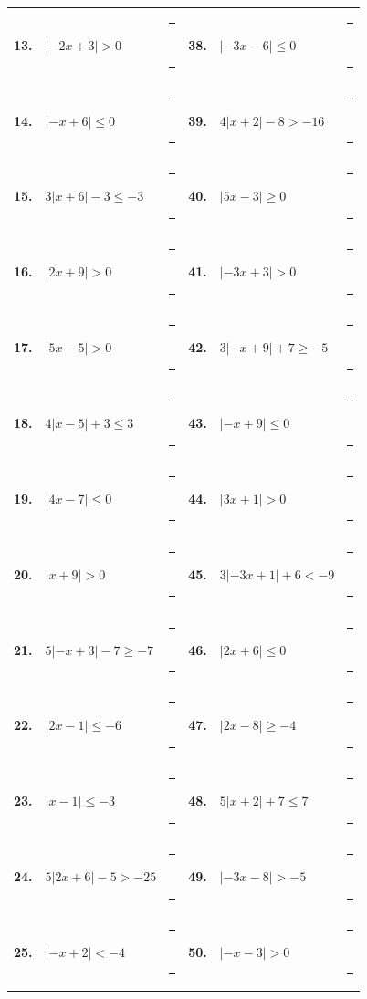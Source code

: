 \documentclass[10pt]{article}
\begin{document}
{\begin{tabular}{@{}r@{\ \ }p{4.1cm}p{4.0cm}@{\qquad}r@{\ \ }p{4.1cm}p{4.0cm}@{}}
\textbf{13.} & $\left|-2x+3\right|>0$ & \rule{0.6cm}{0.4pt}\ \rule{2.8cm}{0.4pt} & \textbf{38.} & $\left|-3x-6\right|\le0$ & \rule{0.6cm}{0.4pt}\ \rule{2.8cm}{0.4pt}\\
\textbf{14.} & $\left|-x+6\right|\le0$ & \rule{0.6cm}{0.4pt}\ \rule{2.8cm}{0.4pt} & \textbf{39.} & $4\left|x+2\right|-8>-16$ & \rule{0.6cm}{0.4pt}\ \rule{2.8cm}{0.4pt}\\
\textbf{15.} & $3\left|x+6\right|-3\le-3$ & \rule{0.6cm}{0.4pt}\ \rule{2.8cm}{0.4pt} & \textbf{40.} & $\left|5x-3\right|\ge0$ & \rule{0.6cm}{0.4pt}\ \rule{2.8cm}{0.4pt}\\
\textbf{16.} & $\left|2x+9\right|>0$ & \rule{0.6cm}{0.4pt}\ \rule{2.8cm}{0.4pt} & \textbf{41.} & $\left|-3x+3\right|>0$ & \rule{0.6cm}{0.4pt}\ \rule{2.8cm}{0.4pt}\\
\textbf{17.} & $\left|5x-5\right|>0$ & \rule{0.6cm}{0.4pt}\ \rule{2.8cm}{0.4pt} & \textbf{42.} & $3\left|-x+9\right|+7\ge-5$ & \rule{0.6cm}{0.4pt}\ \rule{2.8cm}{0.4pt}\\
\textbf{18.} & $4\left|x-5\right|+3\le3$ & \rule{0.6cm}{0.4pt}\ \rule{2.8cm}{0.4pt} & \textbf{43.} & $\left|-x+9\right|\le0$ & \rule{0.6cm}{0.4pt}\ \rule{2.8cm}{0.4pt}\\
\textbf{19.} & $\left|4x-7\right|\le0$ & \rule{0.6cm}{0.4pt}\ \rule{2.8cm}{0.4pt} & \textbf{44.} & $\left|3x+1\right|>0$ & \rule{0.6cm}{0.4pt}\ \rule{2.8cm}{0.4pt}\\
\textbf{20.} & $\left|x+9\right|>0$ & \rule{0.6cm}{0.4pt}\ \rule{2.8cm}{0.4pt} & \textbf{45.} & $3\left|-3x+1\right|+6<-9$ & \rule{0.6cm}{0.4pt}\ \rule{2.8cm}{0.4pt}\\
\textbf{21.} & $5\left|-x+3\right|-7\ge-7$ & \rule{0.6cm}{0.4pt}\ \rule{2.8cm}{0.4pt} & \textbf{46.} & $\left|2x+6\right|\le0$ & \rule{0.6cm}{0.4pt}\ \rule{2.8cm}{0.4pt}\\
\textbf{22.} & $\left|2x-1\right|\le-6$ & \rule{0.6cm}{0.4pt}\ \rule{2.8cm}{0.4pt} & \textbf{47.} & $\left|2x-8\right|\ge-4$ & \rule{0.6cm}{0.4pt}\ \rule{2.8cm}{0.4pt}\\
\textbf{23.} & $\left|x-1\right|\le-3$ & \rule{0.6cm}{0.4pt}\ \rule{2.8cm}{0.4pt} & \textbf{48.} & $5\left|x+2\right|+7\le7$ & \rule{0.6cm}{0.4pt}\ \rule{2.8cm}{0.4pt}\\
\textbf{24.} & $5\left|2x+6\right|-5>-25$ & \rule{0.6cm}{0.4pt}\ \rule{2.8cm}{0.4pt} & \textbf{49.} & $\left|-3x-8\right|>-5$ & \rule{0.6cm}{0.4pt}\ \rule{2.8cm}{0.4pt}\\
\textbf{25.} & $\left|-x+2\right|<-4$ & \rule{0.6cm}{0.4pt}\ \rule{2.8cm}{0.4pt} & \textbf{50.} & $\left|-x-3\right|>0$ & \rule{0.6cm}{0.4pt}\ \rule{2.8cm}{0.4pt}\\
\end{tabular}}
\end{document}
